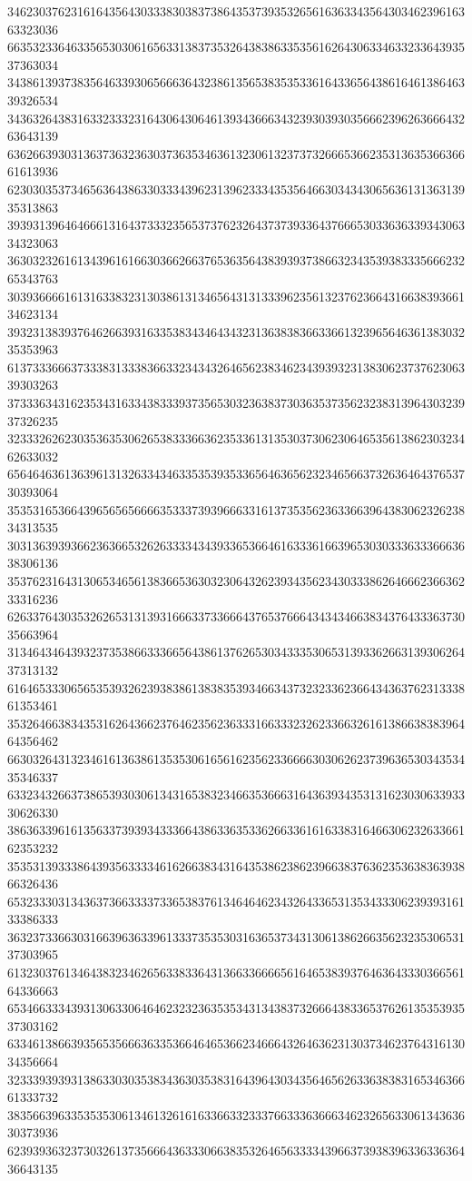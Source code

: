 34623037623161643564303338303837386435373935326561636334356430346239616363323036
66353233646335653030616563313837353264383863353561626430633463323364393537363034
34386139373835646339306566636432386135653835353361643365643861646138646339326534
34363264383163323332316430643064613934366634323930393035666239626366643263643139
63626639303136373632363037363534636132306132373732666536623531363536636661613936
62303035373465636438633033343962313962333435356466303434306563613136313935313863
39393139646466613164373332356537376232643737393364376665303363633934306334323063
36303232616134396161663036626637653635643839393738663234353938333566623265343763
30393666616131633832313038613134656431313339623561323762366431663839366134623134
39323138393764626639316335383434643432313638383663366132396564636138303235353963
61373336663733383133383663323434326465623834623439393231383062373762306339303263
37333634316235343163343833393735653032363837303635373562323831396430323937326235
32333262623035363530626538333663623533613135303730623064653561386230323462633032
65646463613639613132633434633535393533656463656232346566373263646437653730393064
35353165366439656565666635333739396663316137353562363366396438306232623834313535
30313639393662363665326263333434393365366461633361663965303033363336663638306136
35376231643130653465613836653630323064326239343562343033386264666236636233316236
62633764303532626531313931666337336664376537666434343466383437643336373035663964
31346434643932373538663336656438613762653034333530653139336266313930626437313132
61646533306565353932623938386138383539346634373232336236643436376231333861353461
35326466383435316264366237646235623633316633323262336632616138663838396464356462
66303264313234616136386135353061656162356233666630306262373963653034353435346337
63323432663738653930306134316538323466353666316436393435313162303063393330626330
38636339616135633739393433366438633635336266336161633831646630623263366162353232
35353139333864393563333461626638343164353862386239663837636235363836393866326436
65323330313436373663333733653837613464646234326433653135343330623939316133386333
36323733663031663963633961333735353031636537343130613862663562323530653137303965
61323037613464383234626563383364313663366665616465383937646364333036656164336663
65346633343931306330646462323236353534313438373266643833653762613535393537303162
63346138663935653566636335366464653662346664326463623130373462376431613034356664
32333939393138633030353834363035383164396430343564656263363838316534636661333732
38356639633535353061346132616163366332333766333636663462326563306134363630373936
62393936323730326137356664363330663835326465633334396637393839633633636436643135
